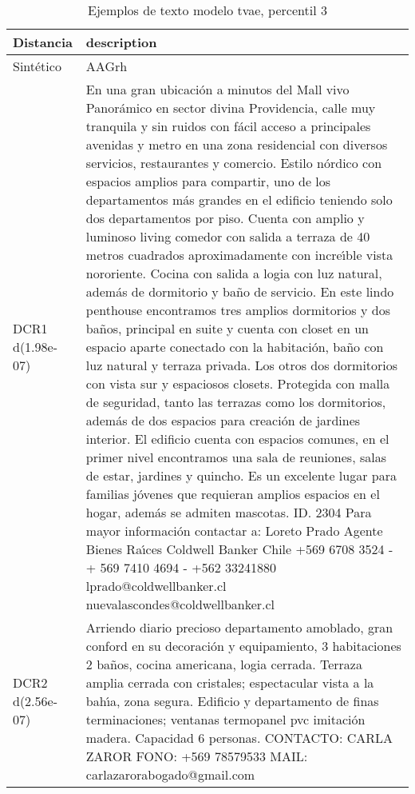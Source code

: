 \begin{table}[H]
\centering
\fontsize{10}{14}\selectfont
\caption{Ejemplos de texto modelo tvae, percentil 3}
\label{table-example-economicos-a-1-tvae-3p-text}
\begin{tabular}{|l|m{35em}|}
\hline
\rowcolor[gray]{0.8}
Distancia & description \\
\hline Sintético & AAGrh \\
\hline DCR1 d(1.98e-07) & En una gran ubicaci\'on  a minutos del Mall vivo Panor\'amico en sector divina Providencia, calle muy tranquila y sin ruidos con f\'acil acceso a principales avenidas y metro en una zona residencial con diversos servicios, restaurantes y comercio. 
Estilo n\'ordico con espacios amplios para compartir, uno de los departamentos m\'as grandes en el edificio teniendo solo dos departamentos por piso.
Cuenta con amplio y luminoso living comedor con salida a terraza de 40 metros cuadrados aproximadamente con incre{\'\i}ble vista nororiente. 
Cocina con salida a logia con luz natural, adem\'as de dormitorio y ba\~no de servicio.
En este lindo penthouse encontramos tres amplios dormitorios y dos ba\~nos, principal en suite y cuenta con closet en un espacio aparte conectado con la habitaci\'on, ba\~no con luz natural y terraza privada. 
Los otros dos dormitorios con vista sur y espaciosos closets. 
Protegida con malla de seguridad, tanto las terrazas como los dormitorios, adem\'as de dos espacios para creaci\'on de jardines interior. 
El edificio cuenta con espacios comunes, en el primer nivel encontramos una sala de reuniones, salas de estar, jardines y quincho.
Es un excelente lugar para familias j\'ovenes que requieran amplios espacios en el hogar, adem\'as se admiten mascotas. 
ID. 2304
Para mayor informaci\'on contactar a:
Loreto  Prado 
Agente Bienes Ra{\'\i}ces
Coldwell Banker Chile
+569 6708 3524 - + 569 7410 4694 - +562 33241880
lprado@coldwellbanker.cl
nuevalascondes@coldwellbanker.cl \\
\hline DCR2 d(2.56e-07) & Arriendo diario precioso departamento amoblado, gran conford en su decoraci\'on y equipamiento,
 3 habitaciones  2 ba\~nos,  cocina americana, logia cerrada.  Terraza amplia cerrada con cristales; espectacular vista a la bah{\'\i}a, zona segura.  Edificio y departamento de finas terminaciones; ventanas termopanel pvc imitaci\'on madera. Capacidad 6 personas.  CONTACTO: CARLA ZAROR FONO: +569 78579533 MAIL: carlazarorabogado@gmail.com \\
\hline
\end{tabular}
\end{table}
